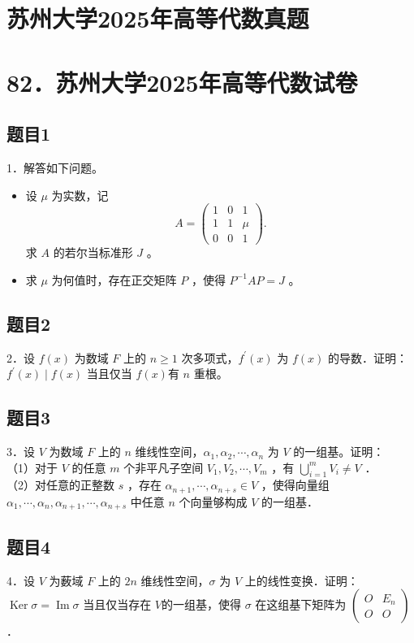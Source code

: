 \documentclass{article}
\begin{document}
\section*{苏州大学2025年高等代数真题}
\section*{82．苏州大学2025年高等代数试卷}

\subsection{题目1}
1．解答如下问题。

\begin{itemize}
  \item[（1）] 设 \(\mu\) 为实数，记
\[
A=\left(\begin{array}{lll}
1 & 0 & 1 \\
1 & 1 & \mu \\
0 & 0 & 1
\end{array}\right) .
\]
求 \(A\) 的若尔当标准形 \(J\) 。
  \item[（2）] 求 \(\mu\) 为何值时，存在正交矩阵 \(P\) ，使得 \(P^{-1} A P=J\) 。
\end{itemize}

\subsection{题目2}
2．设 \(f(x)\) 为数域 \(F\) 上的 \(n \geq 1\) 次多项式，\(f^{\prime}(x)\) 为 \(f(x)\) 的导数．证明：\(f^{\prime}(x) \mid f(x)\) 当且仅当 \(f(x)\)有 \(n\) 重根。

\subsection{题目3}
3．设 \(V\) 为数域 \(F\) 上的 \(n\) 维线性空间，\(\alpha_{1}, \alpha_{2}, \cdots, \alpha_{n}\) 为 \(V\) 的一组基。证明：\\
（1）对于 \(V\) 的任意 \(m\) 个非平凡子空间 \(V_{1}, V_{2}, \cdots, V_{m}\) ，有 \(\bigcup_{i=1}^{m} V_{i} \neq V\) ．\\
（2）对任意的正整数 \(s\) ，存在 \(\alpha_{n+1}, \cdots, \alpha_{n+s} \in V\) ，使得向量组 \(\alpha_{1}, \cdots, \alpha_{n}, \alpha_{n+1}, \cdots, \alpha_{n+s}\) 中任意 \(n\) 个向量够构成 \(V\) 的一组基．

\subsection{题目4}
4．设 \(V\) 为薮域 \(F\) 上的 \(2 n\) 维线性空间，\(\sigma\) 为 \(V\) 上的线性变换．证明： \(\operatorname{Ker} \sigma=\operatorname{Im} \sigma\) 当且仅当存在 \(V\)的一组基，使得 \(\sigma\) 在这组基下矩阵为 \(\left(\begin{array}{cc}O & E_{n} \\ O & O\end{array}\right)\) ．
\end{document}
